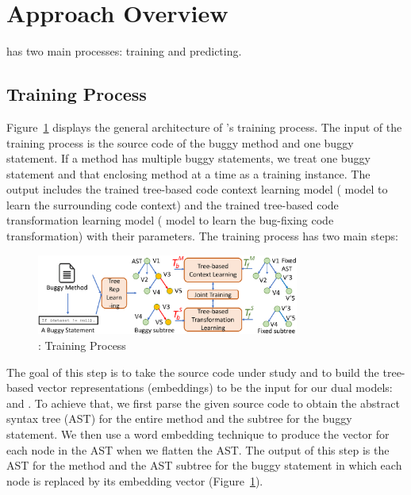 \section{Approach Overview}
\label{overview:sec}

{\tool} has two main processes: training and predicting.

\subsection{Training Process}

Figure~\ref{overview-training} displays the general architecture of
{\tool}'s training process. The input of the training process is the
source code of the buggy method and one buggy statement. If a method
has multiple buggy statements, we treat one buggy statement and that
enclosing method at a time as a training instance. The output includes
the trained tree-based code context learning model ( model
to learn the surrounding code context) and the trained tree-based code
transformation learning model ( model to learn the
bug-fixing code transformation) with their parameters. The training
process has two main steps:

\begin{figure}[t]
	\centering
	\includegraphics[width=3.4in]{graphs/overview-training.png}
	\caption{{\tool}: Training Process}
	\label{overview-training}
\end{figure}

 The goal of this
step is to take the source code under study and to build the
tree-based vector representations (embeddings) to be the input for our
dual models:  and . To achieve that, we first
parse the given source code to obtain the abstract syntax tree (AST)
for the entire method and the subtree for the buggy statement.  We
then use a word embedding technique to produce the vector for each
node in the AST when we flatten the AST. The output of this step is
the AST for the method and the AST subtree for the buggy statement in
which each node is replaced by its embedding vector
(Figure~\ref{overview-training}).

